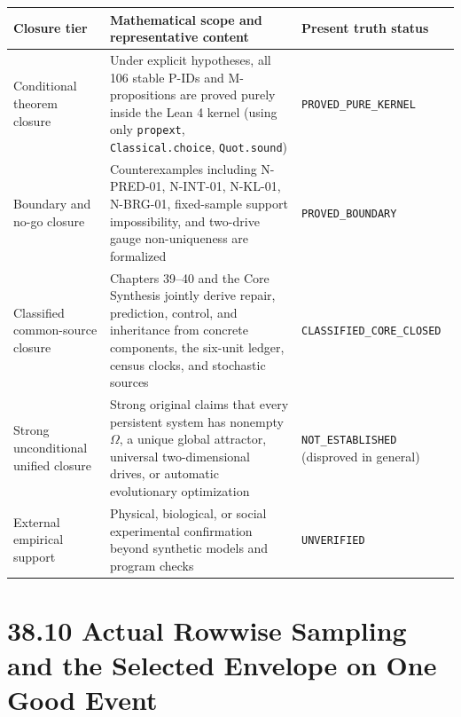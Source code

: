 \documentclass[
  english,
  11pt,
  oneside]{book}
\newcounter{none} %
\begin{document}
{\def\LTcaptype{none} %
\begin{longtable}[]{@{}
  >{\raggedright\arraybackslash}p{}
  >{\raggedright\arraybackslash}p{}
  >{\raggedright\arraybackslash}p{}@{}}
\toprule\noalign{}
\begin{minipage}[b]{\linewidth}\raggedright
Closure tier
\end{minipage} & \begin{minipage}[b]{\linewidth}\raggedright
Mathematical scope and representative content
\end{minipage} & \begin{minipage}[b]{\linewidth}\raggedright
Present truth status
\end{minipage} \\
\midrule\noalign{}
\endhead
\bottomrule\noalign{}
\endlastfoot
Conditional theorem closure & Under explicit hypotheses, all 106 stable P-IDs and M-propositions are proved purely inside the Lean 4 kernel (using only \texttt{propext}, \nolinkurl{Classical.choice}, \texttt{Quot.sound}) & \nolinkurl{PROVED_PURE_KERNEL} \\
Boundary and no-go closure & Counterexamples including N-PRED-01, N-INT-01, N-KL-01, N-BRG-01, fixed-sample support impossibility, and two-drive gauge non-uniqueness are formalized & \nolinkurl{PROVED_BOUNDARY} \\
Classified common-source closure & Chapters 39--40 and the Core Synthesis jointly derive repair, prediction, control, and inheritance from concrete components, the six-unit ledger, census clocks, and stochastic sources & \nolinkurl{CLASSIFIED_CORE_CLOSED} \\
Strong unconditional unified closure & Strong original claims that every persistent system has nonempty \(\Omega\), a unique global attractor, universal two-dimensional drives, or automatic evolutionary optimization & \nolinkurl{NOT_ESTABLISHED} (disproved in general) \\
External empirical support & Physical, biological, or social experimental confirmation beyond synthetic models and program checks & \texttt{UNVERIFIED} \\
\end{longtable}
}

\section{38.10 Actual Rowwise Sampling and the Selected Envelope on One Good Event}\label{actual-rowwise-sampling-and-the-selected-envelope-on-one-good-event}
\end{document}
